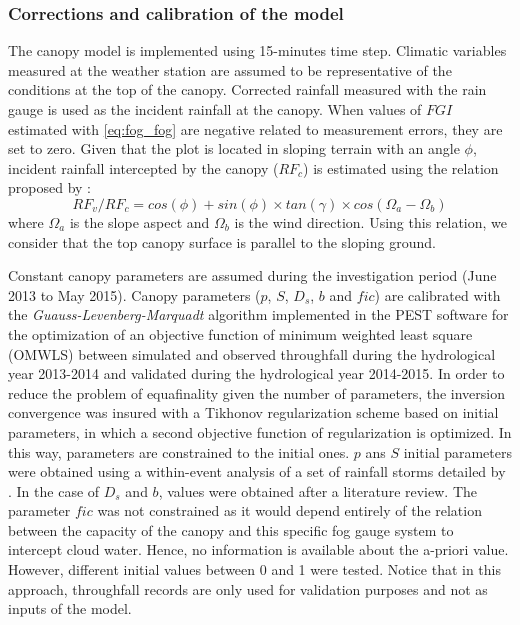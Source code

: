 \documentclass[a4paper,12pt]{article}
\begin{document}
\begin{linenumbers}
\subsubsection{Corrections and calibration of the model}
The canopy model is implemented using 15-minutes time step. Climatic variables measured at the weather station are assumed to be representative of the conditions at the top of the canopy. Corrected rainfall measured with the rain gauge is used as the incident rainfall at the canopy. When values of $FGI$ estimated with \autoref{eq:fog_fog} are negative related to measurement errors, they are set to zero. Given that the plot is located in sloping terrain with an angle $\phi$, incident rainfall intercepted by the canopy ($RF_c$) is estimated using the relation proposed by \cite{Sharon1980}:
\begin{equation} \label{eq:fog_coef}
RF_v/RF_c = cos(\phi) + sin(\phi) \times tan(\gamma) \times cos(\Omega_a - \Omega_b) 
\end{equation}
where $\Omega_a$ is the slope aspect and $ \Omega_b$ is the wind direction. Using this relation, we consider that the top canopy surface is parallel to the sloping ground. 
  
Constant canopy parameters are assumed during the investigation period (June 2013 to May 2015). Canopy parameters ($p$, $S$, $D_s$, $b$ and $fic$) are calibrated with the \emph{Guauss-Levenberg-Marquadt} algorithm implemented in the PEST software \citep{PestDoherty2010} for the optimization of an objective function of minimum weighted least square (OMWLS) between simulated and observed throughfall during the hydrological year 2013-2014 and validated during the hydrological year 2014-2015. In order to reduce the problem of equafinality given the number of parameters, the inversion convergence was insured with a Tikhonov regularization scheme based on initial parameters, in which a second objective function of regularization is optimized. In this way, parameters are constrained to the initial ones. $p$ ans $S$ initial parameters were obtained using a within-event analysis of a set of rainfall storms detailed by \cite{Linketal2004}. In the case of $D_s$ and $b$, values were obtained after a literature review. The parameter $fic$ was not constrained as it would depend entirely of the relation between the capacity of the canopy and this specific fog gauge system to intercept cloud water. Hence, no information is available about the a-priori value. However, different initial values between 0 and 1 were tested. Notice that in this approach, throughfall records are only used for validation purposes and not as inputs of the model.


\end{linenumbers}
\end{document}

